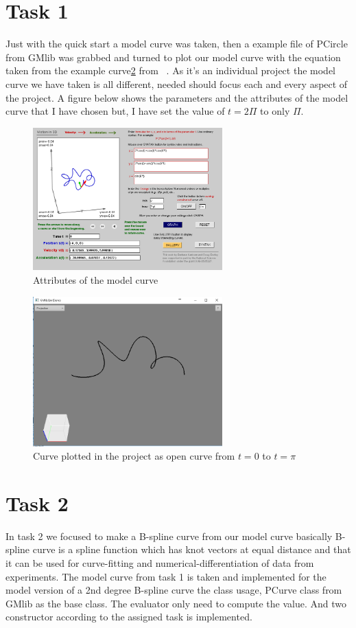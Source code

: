 \documentclass[a4,10pt]{article}
\begin{document}
\section{Task 1}
Just with the quick start a model curve was taken, then a example file of PCircle from GMlib was grabbed and turned to plot our model curve with the equation taken from the example curve\cref{fig:model} from ~\cite{ModelCurve}.
As it's an individual project the model curve we have taken is all different, needed should focus each and every aspect of the project. A figure below shows the parameters and the attributes of the model curve  that I have chosen but, I have set the value of $t=2\Pi$ to only $\Pi$.
\begin{figure}[h!]
\centering
\includegraphics[width=0.65\textwidth]{gfx/ModelCurve.PNG}
\caption{Attributes of the model curve}
\label{fig:modelcurve}
\end{figure}
\begin{figure}[H]
\centering
\includegraphics[width=0.65\textwidth]{gfx/Model.PNG}
\caption{Curve plotted in the project as open curve from $t=0 $ to $t=\pi $}
\label{fig:model}
\end{figure}

\section{Task 2}
In task 2 we focused to make a B-spline curve from our model curve basically B-spline curve is a spline function which has knot vectors at equal distance and that it can be used for
curve-fitting and numerical-differentiation of data from experiments.
The model curve from task 1 is taken and implemented for the model version of a 2nd degree B-spline curve
the class usage, PCurve class from GMlib as the base class. The evaluator only need to compute the value. And two constructor according to the assigned task is implemented.
\end{document}
